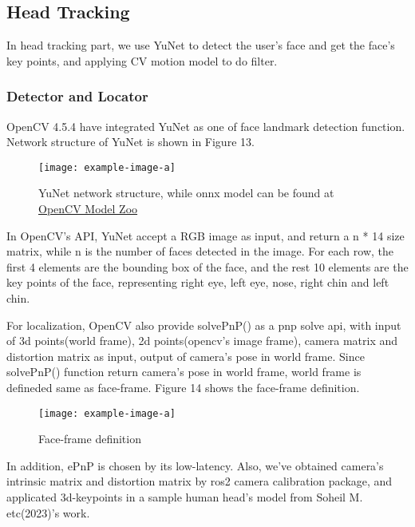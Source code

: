 \subsection{Head Tracking}
In head tracking part, we use YuNet\cite{Wu_2023} to detect the user's face and get the face's key points, and applying CV motion model to do filter.

\subsubsection{Detector and Locator}
OpenCV 4.5.4\cite{opencv_4_5_4} have integrated YuNet as one of face landmark detection function. Network structure of YuNet is shown in Figure 13. 

\begin{figure}[htb]
    \centering
    \texttt{[image: example-image-a]}
    \caption{YuNet network structure, while onnx model can be found at \href{https://github.com/opencv/opencv_zoo/tree/main/models/face_detection_yunet}{OpenCV Model Zoo}}\label{F:test-a}
\end{figure}

In OpenCV's API, YuNet accept a RGB image as input, and return a n * 14 size matrix, while n is the number of faces detected in the image. For each row, the first 4 elements are the bounding box of the face, and the rest 10 elements are the key points of the face, representing right eye, left eye, nose, right chin and left chin.




For localization, OpenCV also provide solvePnP() as a pnp
 solve api, with input of 3d points(world frame), 2d points(opencv's image frame), camera matrix and distortion matrix as input, output of camera's pose in world frame. Since solvePnP() function return camera's pose in world frame, world frame is defineded same as face-frame. Figure 14 shows the face-frame definition.

\begin{figure}[htb]
    \centering
    \texttt{[image: example-image-a]}
    \caption{Face-frame definition}\label{F:test-a}
\end{figure}

In addition, ePnP is chosen by its low-latency\cite{EPnP_2009}. Also, we've obtained camera's intrinsic matrix and distortion matrix by ros2 camera calibration package\cite{ros2_camera_calibration}, and applicated 3d-keypoints in a sample human head's model from Soheil M. etc(2023)'s work.\cite{soheil2023facial}

